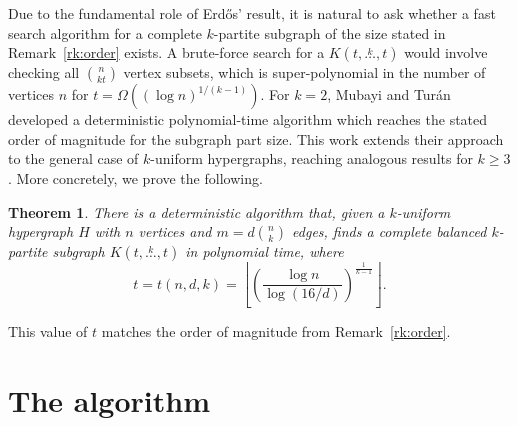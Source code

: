 \documentclass{amsart}
\newcommand{\compoverset}[2]{\ensuremath{K(#2, \overset{#1}{\dots}, #2)}}
\newcommand{\bigOmega}[1]{\ensuremath{\Omega\left(#1\right)}}
\newtheorem{theorem}[subsection]{Theorem}
\begin{document}
Due to the fundamental role of Erd\H{o}s' result,
it is natural to ask whether a fast search algorithm for a complete $k$-partite subgraph of the size stated in Remark~\ref{rk:order} exists.
A brute-force search for a $\compoverset{k}{t}$ would involve checking all $\binom{n}{kt}$ vertex subsets,
which is super-polynomial in the number of vertices $n$ for ${t = \bigOmega{(\log n)^{1/(k-1)}}}$.
For $k=2$, Mubayi and Tur\'{a}n~\cite{MUBAYI2010174} developed a deterministic polynomial-time algorithm which reaches the stated order of magnitude for the subgraph part size.
This work extends their approach to the general case of $k$-uniform hypergraphs, reaching analogous results for $k \ge 3$.
More concretely, we prove the following.

\begin{theorem} \label{thm:main_theorem}
There is a deterministic algorithm that, given a $k$-uniform hypergraph $H$ with $n$ vertices and $m=d \binom{n}{k}$ edges, finds a complete balanced $k$-partite subgraph $\compoverset{k}{t}$ in polynomial time, where
\[
    t = t(n, d, k) = \left\lfloor \left( \frac{\log n}{\log (16/d)}\right)^{\frac{1}{k-1}}\right\rfloor.
\]
\end{theorem}
This value of $t$ matches the order of magnitude from Remark~\ref{rk:order}.

\section{The algorithm}\label{sec:algorithm}
\end{document}
